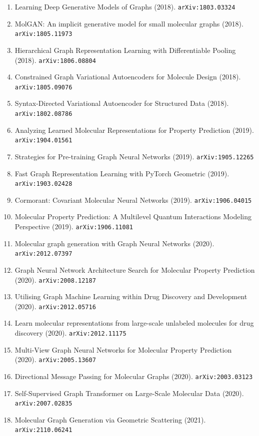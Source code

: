 \documentclass[11pt]{article}
\begin{document}
\begin{enumerate}
  \item Learning Deep Generative Models of Graphs (2018). \texttt{arXiv:1803.03324}
  \item MolGAN: An implicit generative model for small molecular graphs (2018). \texttt{arXiv:1805.11973}
  \item Hierarchical Graph Representation Learning with Differentiable Pooling (2018). \texttt{arXiv:1806.08804}
  \item Constrained Graph Variational Autoencoders for Molecule Design (2018). \texttt{arXiv:1805.09076}
  \item Syntax-Directed Variational Autoencoder for Structured Data (2018). \texttt{arXiv:1802.08786}
  \item Analyzing Learned Molecular Representations for Property Prediction (2019). \texttt{arXiv:1904.01561}
  \item Strategies for Pre-training Graph Neural Networks (2019). \texttt{arXiv:1905.12265}
  \item Fast Graph Representation Learning with PyTorch Geometric (2019). \texttt{arXiv:1903.02428}
  \item Cormorant: Covariant Molecular Neural Networks (2019). \texttt{arXiv:1906.04015}
  \item Molecular Property Prediction: A Multilevel Quantum Interactions
  Modeling Perspective (2019). \texttt{arXiv:1906.11081}
  \item Molecular graph generation with Graph Neural Networks (2020). \texttt{arXiv:2012.07397}
  \item Graph Neural Network Architecture Search for Molecular Property
  Prediction (2020). \texttt{arXiv:2008.12187}
  \item Utilising Graph Machine Learning within Drug Discovery and Development (2020). \texttt{arXiv:2012.05716}
  \item Learn molecular representations from large-scale unlabeled molecules for
  drug discovery (2020). \texttt{arXiv:2012.11175}
  \item Multi-View Graph Neural Networks for Molecular Property Prediction (2020). \texttt{arXiv:2005.13607}
  \item Directional Message Passing for Molecular Graphs (2020). \texttt{arXiv:2003.03123}
  \item Self-Supervised Graph Transformer on Large-Scale Molecular Data (2020). \texttt{arXiv:2007.02835}
  \item Molecular Graph Generation via Geometric Scattering (2021). \texttt{arXiv:2110.06241}

\end{enumerate}
\end{document}
